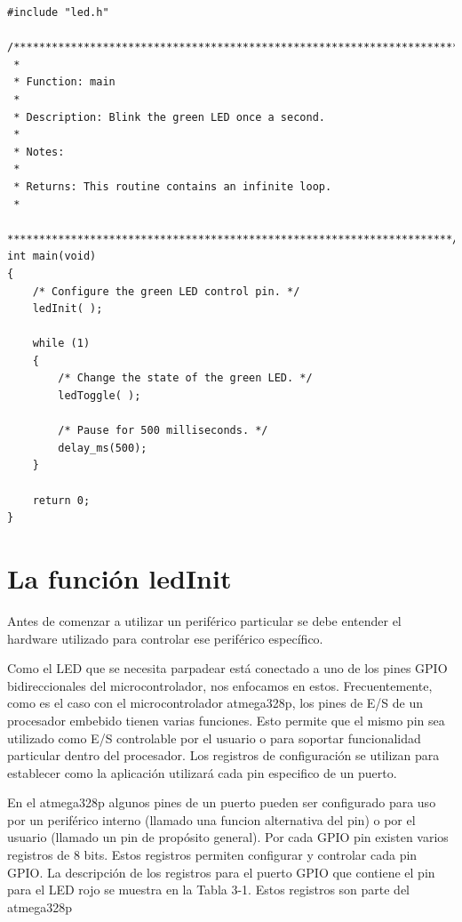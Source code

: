 \documentclass[12pt]{article}
\begin{document}
\begin{verbatim}
#include "led.h"

/**********************************************************************
 *
 * Function: main
 *
 * Description: Blink the green LED once a second.
 *
 * Notes:
 *
 * Returns: This routine contains an infinite loop.
 *
 **********************************************************************/
int main(void)
{
    /* Configure the green LED control pin. */
    ledInit( );

    while (1)
    {
        /* Change the state of the green LED. */
        ledToggle( );

        /* Pause for 500 milliseconds. */
        delay_ms(500);
    }

    return 0;
}
\end{verbatim}

\section *{La función ledInit}

Antes de comenzar a utilizar un periférico particular se debe entender el 
hardware utilizado para controlar ese periférico específico.


Como el LED que se necesita parpadear está conectado a uno de los pines
GPIO bidireccionales del microcontrolador, nos enfocamos en estos.
Frecuentemente, como es el caso con el microcontrolador atmega328p, los
pines de E/S de un procesador embebido tienen varias funciones.
Esto permite que el mismo pin sea utilizado como E/S controlable por el usuario
o para soportar funcionalidad particular dentro del procesador.
Los registros de configuración se utilizan para establecer como la aplicación
utilizará cada pin especifico de un puerto.

En el atmega328p algunos pines de un puerto pueden ser configurado para
uso por un periférico interno (llamado una funcion alternativa del pin)
o por el usuario (llamado un pin de propósito general). Por cada GPIO pin
existen varios registros de 8 bits. Estos registros
permiten configurar y controlar cada pin GPIO.
La descripción de los registros para el puerto GPIO que contiene el pin
para el LED rojo se muestra en la Tabla 3-1. Estos registros son parte
del atmega328p
\end{document}
